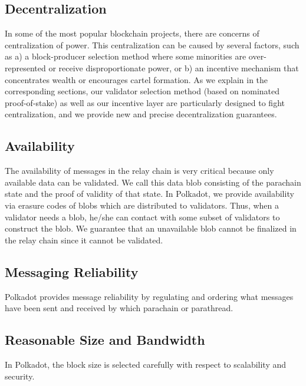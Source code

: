 \subsection{Decentralization}

In some of the most popular blockchain projects, there are concerns of centralization of power.
This centralization can be caused by several factors, such as
a) a block-producer selection method where some minorities are over-represented or receive disproportionate power, or
b) an incentive mechanism that concentrates wealth or encourages cartel formation.
As we explain in the corresponding sections, our validator selection method (based on nominated proof-of-stake)
as well as our incentive layer are particularly designed to fight centralization,
and we provide new and precise decentralization guarantees.


 \subsection{Availability}
The availability of messages in the relay chain is very critical because only available data can be validated. We call this data blob consisting of the parachain state and the proof of validity of that state. In Polkadot, we provide availability via erasure codes of blobs which are distributed to validators. Thus, when a validator needs a blob, he/she can contact with some subset of validators to construct the blob. We guarantee that an unavailable blob cannot be finalized in the relay chain since it cannot be validated.



\subsection{Messaging Reliability} Polkadot provides message reliability by regulating and ordering what messages have been sent and received by which parachain or parathread.

\subsection{Reasonable Size and Bandwidth} In Polkadot, the block size is selected carefully with respect to scalability and security.


